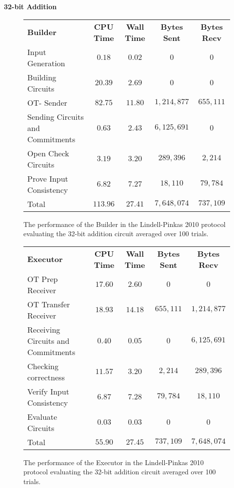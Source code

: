 \documentclass[ %
                    author={Nicholas Tutte},
                supervisor={Prof. Nigel Smart},
                    degree={MEng},
                     title={Secure Two Party Computation},
                  subtitle={A practical comparison of recent protocols},
                      type={Research - GG1K},
                      year={2015} ]{dissertation}
\begin{document}
				\FloatBarrier
				\noindent \textbf{32-bit Addition}
				\begin{figure}[!ht]
					\begin{tabular}{| p{4.3cm} | c c c c |}
						\hline
						\textbf{Builder} & \textbf{CPU Time} & \textbf{Wall Time} & \textbf{Bytes Sent} & \textbf{Bytes Recv} \\
						\thickhline
						Input Generation & $0.18$ & $0.02$ & $0$ & $0$ \\
						\hline
						Building Circuits & $20.39$ & $2.69$ & $0$ & $0$ \\
						\hline
						OT- Sender & $82.75$ & $11.80$ & $1,214,877$ & $655,111$ \\
						\hline
						Sending Circuits and Commitments & $0.63$ & $2.43$ & $6,125,691$ & $0$ \\
						\hline
						Open Check Circuits & $3.19$ & $3.20$ & $289,396$ & $2,214$ \\
						\hline
						Prove Input Consistency & $6.82$ & $7.27$ & $18,110$ & $79,784$ \\
						\thickhline
						Total & $113.96$ & $27.41$ & $7,648,074$ & $737,109$ \\
						\hline
					\end{tabular}
					\caption{The performance of the Builder in the Lindell-Pinkas 2010 protocol evaluating the 32-bit addition circuit averaged over 100 trials. \label{table:LP_2010_Add_Builder}}
				\end{figure}
					
				\begin{figure}[!ht]
					\begin{tabular}{| p{4.3cm} | c c c c |}
						\hline
						\textbf{Executor} & \textbf{CPU Time} & \textbf{Wall Time} & \textbf{Bytes Sent} & \textbf{Bytes Recv} \\
						\thickhline
						OT Prep Receiver & $17.60$ & $2.60$ & $0$ & $0$ \\
						\hline
						OT Transfer Receiver & $18.93$ & $14.18$ & $655,111$ & $1,214,877$ \\
						\hline
						Receiving Circuits and Commitments & $0.40$ & $0.05$ & $0$ & $6,125,691$ \\
						\hline
						Checking correctness & $11.57$ & $3.20$ & $2,214$ & $289,396$ \\
						\hline
						Verify Input Consistency & $6.87$ & $7.28$ & $79,784$ & $18,110$ \\
						\hline
						Evaluate Circuits & $0.03$ & $0.03$ & $0$ & $0$ \\
						\thickhline
						Total & $55.90$ & $27.45$ & $737,109$ & $7,648,074$ \\
						\hline
					\end{tabular}
					\caption{The performance of the Executor in the Lindell-Pinkas 2010 protocol evaluating the 32-bit addition circuit averaged over 100 trials.\label{table:LP_2010_Add_Executor}}
				\end{figure}
				\FloatBarrier
\end{document}
